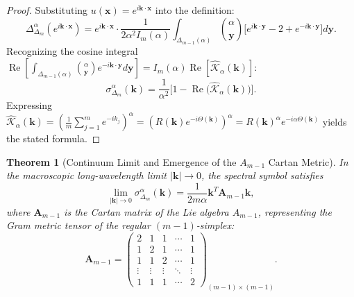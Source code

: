 \documentclass[11pt,a4paper]{article}
\theoremstyle{plain}
\newtheorem{theorem}{Theorem}[section]
\theoremstyle{definition}
\theoremstyle{remark}
\numberwithin{equation}{section}
\begin{document}
\begin{proof}
Substituting $u(\mathbf{x}) = e^{i\mathbf{k}\cdot\mathbf{x}}$ into the definition:
\begin{equation}
\Delta_{\Delta_m}^\alpha \left(e^{i\mathbf{k}\cdot\mathbf{x}}\right) = e^{i\mathbf{k}\cdot\mathbf{x}} \cdot \frac{1}{2\alpha^2 I_m(\alpha)}\int_{\Delta_{m-1}(\alpha)} \binom{\alpha}{\mathbf{y}} \Big[e^{i\mathbf{k}\cdot\mathbf{y}} - 2 + e^{-i\mathbf{k}\cdot\mathbf{y}}\Big]d\mathbf{y}.
\end{equation}
Recognizing the cosine integral $\operatorname{Re}\left[\int_{\Delta_{m-1}(\alpha)} \binom{\alpha}{\mathbf{y}}e^{-i\mathbf{k}\cdot\mathbf{y}}d\mathbf{y}\right] = I_m(\alpha)\operatorname{Re}\left[\widehat{\mathcal{K}}_\alpha(\mathbf{k})\right]$:
\begin{equation}
\sigma_{\Delta_m}^\alpha(\mathbf{k}) = \frac{1}{\alpha^2}\Big[1 - \operatorname{Re}\big(\widehat{\mathcal{K}}_\alpha(\mathbf{k})\big)\Big].
\end{equation}
Expressing $\widehat{\mathcal{K}}_\alpha(\mathbf{k}) = \left(\frac{1}{m}\sum_{j=1}^m e^{-ik_j}\right)^\alpha = \left(R(\mathbf{k})e^{-i\Theta(\mathbf{k})}\right)^\alpha = R(\mathbf{k})^\alpha e^{-i\alpha\Theta(\mathbf{k})}$ yields the stated formula.
\end{proof}

\begin{theorem}[Continuum Limit and Emergence of the $A_{m-1}$ Cartan Metric]
In the macroscopic long-wavelength limit $|\mathbf{k}| \to 0$, the spectral symbol satisfies
\begin{equation}
\lim_{|\mathbf{k}| \to 0} \sigma_{\Delta_m}^\alpha(\mathbf{k}) = \frac{1}{2m\alpha}\mathbf{k}^T \mathbf{A}_{m-1}\mathbf{k},
\end{equation}
where $\mathbf{A}_{m-1}$ is the Cartan matrix of the Lie algebra $A_{m-1}$, representing the Gram metric tensor of the regular $(m-1)$-simplex:
\begin{equation}
\mathbf{A}_{m-1} = \begin{pmatrix}
2 & 1 & 1 & \cdots & 1 \\
1 & 2 & 1 & \cdots & 1 \\
1 & 1 & 2 & \cdots & 1 \\
\vdots & \vdots & \vdots & \ddots & \vdots \\
1 & 1 & 1 & \cdots & 2
\end{pmatrix}_{(m-1)\times(m-1)}.
\end{equation}
\end{theorem}
\end{document}
